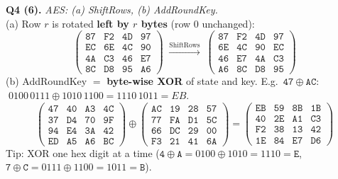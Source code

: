 \textbf{Q4 (6).} \emph{AES: (a) ShiftRows, (b) AddRoundKey.}\\
(a) Row $r$ is rotated \textbf{left by $r$ bytes} (row 0 unchanged):
\[
\begin{pmatrix}\mathtt{87}&\mathtt{F2}&\mathtt{4D}&\mathtt{97}\\\mathtt{EC}&\mathtt{6E}&\mathtt{4C}&\mathtt{90}\\\mathtt{4A}&\mathtt{C3}&\mathtt{46}&\mathtt{E7}\\\mathtt{8C}&\mathtt{D8}&\mathtt{95}&\mathtt{A6}\end{pmatrix}
\;\xrightarrow{\text{ShiftRows}}\;
\begin{pmatrix}\mathtt{87}&\mathtt{F2}&\mathtt{4D}&\mathtt{97}\\\mathtt{6E}&\mathtt{4C}&\mathtt{90}&\mathtt{EC}\\\mathtt{46}&\mathtt{E7}&\mathtt{4A}&\mathtt{C3}\\\mathtt{A6}&\mathtt{8C}&\mathtt{D8}&\mathtt{95}\end{pmatrix}
\]
(b) AddRoundKey $=$ \textbf{byte-wise XOR} of state and key. E.g.\ $\mathtt{47} \oplus \mathtt{AC}$: $\;0100\,0111 \oplus 1010\,1100 = 1110\,1011 = EB$.
\[
\begin{pmatrix}\mathtt{47}&\mathtt{40}&\mathtt{A3}&\mathtt{4C}\\\mathtt{37}&\mathtt{D4}&\mathtt{70}&\mathtt{9F}\\\mathtt{94}&\mathtt{E4}&\mathtt{3A}&\mathtt{42}\\\mathtt{ED}&\mathtt{A5}&\mathtt{A6}&\mathtt{BC}\end{pmatrix}
\oplus
\begin{pmatrix}\mathtt{AC}&\mathtt{19}&\mathtt{28}&\mathtt{57}\\\mathtt{77}&\mathtt{FA}&\mathtt{D1}&\mathtt{5C}\\\mathtt{66}&\mathtt{DC}&\mathtt{29}&\mathtt{00}\\\mathtt{F3}&\mathtt{21}&\mathtt{41}&\mathtt{6A}\end{pmatrix}
=
\begin{pmatrix}\boldsymbol{\mathtt{EB}}&\boldsymbol{\mathtt{59}}&\boldsymbol{\mathtt{8B}}&\boldsymbol{\mathtt{1B}}\\\boldsymbol{\mathtt{40}}&\boldsymbol{\mathtt{2E}}&\boldsymbol{\mathtt{A1}}&\boldsymbol{\mathtt{C3}}\\\boldsymbol{\mathtt{F2}}&\boldsymbol{\mathtt{38}}&\boldsymbol{\mathtt{13}}&\boldsymbol{\mathtt{42}}\\\boldsymbol{\mathtt{1E}}&\boldsymbol{\mathtt{84}}&\boldsymbol{\mathtt{E7}}&\boldsymbol{\mathtt{D6}}\end{pmatrix}
\]
Tip: XOR one hex digit at a time ($\mathtt4 \oplus \mathtt A = 0100 \oplus 1010 = 1110 = \mathtt E$, \;$\mathtt7 \oplus \mathtt C = 0111 \oplus 1100 = 1011 = \mathtt B$).

